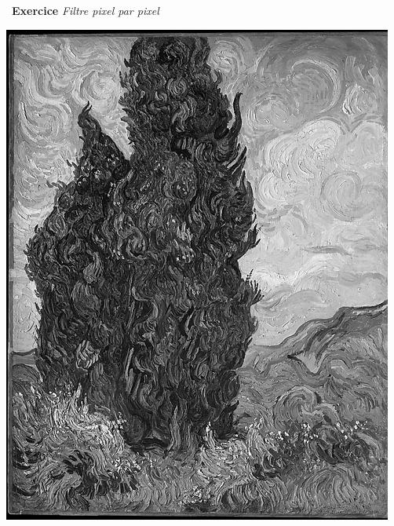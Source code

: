 \documentclass[a4paper, french, 12pt]{article}
\newcounter{exo}
\newenvironment{exercice}[1]
{\par \medskip   \addtocounter{exo}{1} \noindent  
\begin{bclogo}[arrondi =0.1,   noborder = true, logo=\bccrayon, marge=4]{~\textbf{Exercice} \textbf{\theexo} {\itshape #1} }  \par}
{
\end{bclogo}
 \par \bigskip }
\begin{document}
\begin{exercice}{Filtre pixel par pixel}
\begin{enumerate}
\begin{enumerate}
\begin{minipage}{0.45\linewidth}
\begin{center}
\includegraphics[scale=0.25]{images/cypres-gris.png}
\end{center}
\end{minipage}


\end{enumerate} 

\end{enumerate}



\end{exercice}



\newpage

\tableofcontents
 
\end{document}
